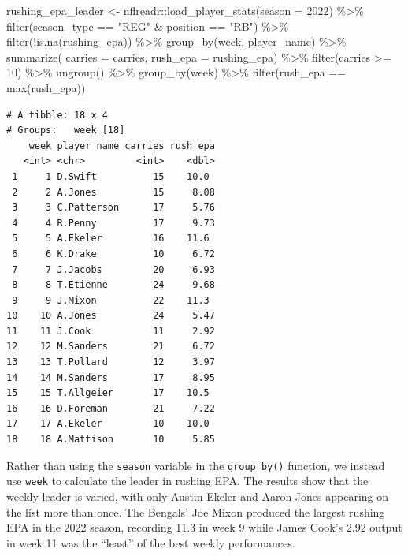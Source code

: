 \documentclass[
  letterpaper,
]{krantz}
\newenvironment{Shaded}{\begin{snugshade}}{\end{snugshade}}
\newcommand{\AttributeTok}[1]{\textcolor[rgb]{0.40,0.45,0.13}{#1}}
\newcommand{\DecValTok}[1]{\textcolor[rgb]{0.68,0.00,0.00}{#1}}
\newcommand{\FunctionTok}[1]{\textcolor[rgb]{0.28,0.35,0.67}{#1}}
\newcommand{\NormalTok}[1]{\textcolor[rgb]{0.00,0.23,0.31}{#1}}
\newcommand{\OtherTok}[1]{\textcolor[rgb]{0.00,0.23,0.31}{#1}}
\newcommand{\SpecialCharTok}[1]{\textcolor[rgb]{0.37,0.37,0.37}{#1}}
\newcommand{\StringTok}[1]{\textcolor[rgb]{0.13,0.47,0.30}{#1}}
\begin{document}
\begin{Shaded}
\begin{Highlighting}[]
\NormalTok{rushing\_epa\_leader }\OtherTok{\textless{}{-}}\NormalTok{ nflreadr}\SpecialCharTok{::}\FunctionTok{load\_player\_stats}\NormalTok{(}\AttributeTok{season =} \DecValTok{2022}\NormalTok{) }\SpecialCharTok{\%\textgreater{}\%}
  \FunctionTok{filter}\NormalTok{(season\_type }\SpecialCharTok{==} \StringTok{"REG"} \SpecialCharTok{\&}\NormalTok{ position }\SpecialCharTok{==} \StringTok{"RB"}\NormalTok{) }\SpecialCharTok{\%\textgreater{}\%}
  \FunctionTok{filter}\NormalTok{(}\SpecialCharTok{!}\FunctionTok{is.na}\NormalTok{(rushing\_epa)) }\SpecialCharTok{\%\textgreater{}\%}
  \FunctionTok{group\_by}\NormalTok{(week, player\_name) }\SpecialCharTok{\%\textgreater{}\%}
  \FunctionTok{summarize}\NormalTok{(}
    \AttributeTok{carries =}\NormalTok{ carries,}
    \AttributeTok{rush\_epa =}\NormalTok{ rushing\_epa) }\SpecialCharTok{\%\textgreater{}\%}
  \FunctionTok{filter}\NormalTok{(carries }\SpecialCharTok{\textgreater{}=} \DecValTok{10}\NormalTok{) }\SpecialCharTok{\%\textgreater{}\%}
  \FunctionTok{ungroup}\NormalTok{() }\SpecialCharTok{\%\textgreater{}\%}
  \FunctionTok{group\_by}\NormalTok{(week) }\SpecialCharTok{\%\textgreater{}\%}
  \FunctionTok{filter}\NormalTok{(rush\_epa }\SpecialCharTok{==} \FunctionTok{max}\NormalTok{(rush\_epa))}
\end{Highlighting}
\end{Shaded}

\begin{verbatim}
# A tibble: 18 x 4
# Groups:   week [18]
    week player_name carries rush_epa
   <int> <chr>         <int>    <dbl>
 1     1 D.Swift          15    10.0 
 2     2 A.Jones          15     8.08
 3     3 C.Patterson      17     5.76
 4     4 R.Penny          17     9.73
 5     5 A.Ekeler         16    11.6 
 6     6 K.Drake          10     6.72
 7     7 J.Jacobs         20     6.93
 8     8 T.Etienne        24     9.68
 9     9 J.Mixon          22    11.3 
10    10 A.Jones          24     5.47
11    11 J.Cook           11     2.92
12    12 M.Sanders        21     6.72
13    13 T.Pollard        12     3.97
14    14 M.Sanders        17     8.95
15    15 T.Allgeier       17    10.5 
16    16 D.Foreman        21     7.22
17    17 A.Ekeler         10    10.0 
18    18 A.Mattison       10     5.85
\end{verbatim}

Rather than using the \texttt{season} variable in the
\texttt{group\_by()} function, we instead use \texttt{week} to calculate
the leader in rushing EPA. The results show that the weekly leader is
varied, with only Austin Ekeler and Aaron Jones appearing on the list
more than once. The Bengals' Joe Mixon produced the largest rushing EPA
in the 2022 season, recording 11.3 in week 9 while James Cook's 2.92
output in week 11 was the ``least'' of the best weekly performances.
\end{document}
